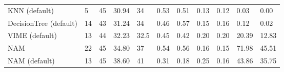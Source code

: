 \begin{tabular}{lllllllllll}
KNN (default) & 5 & 45 & 30.94 & 34 & 0.53 & 0.51 & 0.13 & 0.12 & 0.03 & 0.00 \\
DecisionTree (default) & 14 & 43 & 31.24 & 34 & 0.46 & 0.57 & 0.15 & 0.16 & 0.12 & 0.02 \\
VIME (default) & 13 & 44 & 32.23 & 32.5 & 0.45 & 0.42 & 0.20 & 0.20 & 20.39 & 12.83 \\
NAM & 22 & 45 & 34.80 & 37 & 0.54 & 0.56 & 0.16 & 0.15 & 71.98 & 45.51 \\
NAM (default) & 13 & 45 & 38.60 & 41 & 0.31 & 0.18 & 0.25 & 0.16 & 43.86 & 35.75 \\
\bottomrule
\end{tabular}
